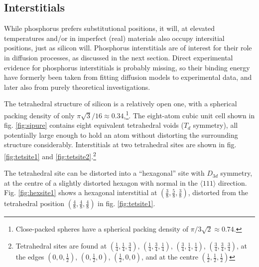 \documentclass[11pt,bibliography=totoc,index=totoc]{scrbook}   %
\begin{document}


%
\subsection{Interstitials}\label{sec:PInterstitials}
%

While phosphorus prefers substitutional positions, it will, at elevated temperatures and/or in imperfect (real) materials also occupy intersitial positions, just as silicon will.
Phosphorus interstitials are of interest for their role in diffusion processes, as discussed in the next section.
Direct experimental evidence for phosphorus interstitials is probably missing, so their binding energy have formerly been taken from fitting diffusion models to experimental data, and later also from purely theoretical investigations.\cite[391]{Pichler:2004}

The tetrahedral structure of silicon is a relatively open one, with a spherical packing density of only $\pi\sqrt{3}/16\approx 0.34$,\footnote{Close-packed spheres have a spherical packing density of $\pi/3\sqrt{2} \approx 0.74$.}.
The eight-atom cubic unit cell shown in fig. \ref{fig:sipure} contains eight equivalent tetrahedral voids ($T_d$ symmetry), all potentially large enough to hold an atom without distorting the surrounding structure considerably.
Interstitials at two tetrahedral sites are shown in fig. \ref{fig:tetsite1} and \ref{fig:tetsite2}.\footnote{Tetrahedral sites are found at
$(\frac{1}{4},\frac{1}{4},\frac{3}{4})$, 
$(\frac{1}{4},\frac{3}{4},\frac{1}{4})$, 
$(\frac{3}{4},\frac{1}{4},\frac{1}{4})$, 
$(\frac{3}{4},\frac{3}{4},\frac{3}{4})$, 
at the edges
$(0,0,\frac{1}{2})$,
$(0,\frac{1}{2},0)$,
$(\frac{1}{2},0,0)$,
and at the centre
$(\frac{1}{2},\frac{1}{2},\frac{1}{2})$}

The tetrahedral site can be distorted into a ``hexagonal'' site with $D_{3d}$ symmetry, 
at the centre of a slightly distorted hexagon with normal in the $\langle 111 \rangle$ direction. 
Fig. \ref{fig:hexsite1} shows a hexagonal interstitial at $(\frac{3}{8},\frac{5}{8},\frac{3}{8})$, 
distorted from the tetrahedral position $(\frac{4}{8},\frac{4}{8},\frac{4}{8})$ in fig. \ref{fig:tetsite1}.
\end{document}
